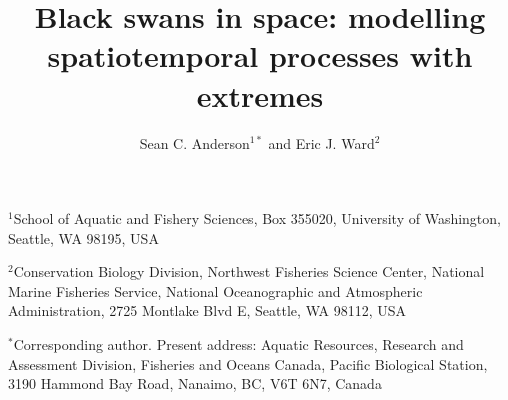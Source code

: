 \documentclass[12pt,english]{article}
\title{
  \vspace{-1.4cm}
  Black swans in space:
  modelling
  spatiotemporal processes with extremes}
\author{
Sean C. Anderson$^{1\ast}$ and
Eric J. Ward$^2$
}
\date{}
\begin{document}
\maketitle

$^1$School of Aquatic and Fishery Sciences, Box 355020, University of
Washington, Seattle, WA 98195, USA

$^2$Conservation Biology Division, Northwest Fisheries Science Center, National
Marine Fisheries Service, National Oceanographic and Atmospheric Administration,
2725 Montlake Blvd E, Seattle, WA 98112, USA

$^{\ast}$Corresponding author. Present address:
Aquatic Resources, Research and Assessment Division,
Fisheries and Oceans Canada,
Pacific Biological Station,
3190 Hammond Bay Road,
Nanaimo, BC, V6T 6N7, Canada

\RaggedRight
{}
\end{document}
